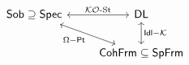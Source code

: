 \documentclass{article}
\theoremstyle{plain}
\theoremstyle{definition}
\theoremstyle{remark}
\newcommand{\bool}[1]{\mathsf{#1}}
\newcommand{\0}{\mathbbm 0}
\newcommand{\1}{\mathbbm 1}
\newcommand{\2}{\mathbbm 2}
\begin{document}
 
\begin{equation}
\label{diag:st-pt}
\begin{tikzcd}
    \bool{Sob} \supseteq \bool{Spec} 
    \arrow[r, leftrightarrow, "\mathcal{KO}\text{-St}"] 
    \arrow[rd,leftrightarrow,  "\Omega\bool{-Pt}"'] 
    & \bool{DL} 
    \arrow[d,leftrightarrow,  "\bool{Idl-}\mathcal{K}"] \\
    & \bool{CohFrm \subseteq SpFrm}
\end{tikzcd}
\end{equation}






\end{document}
